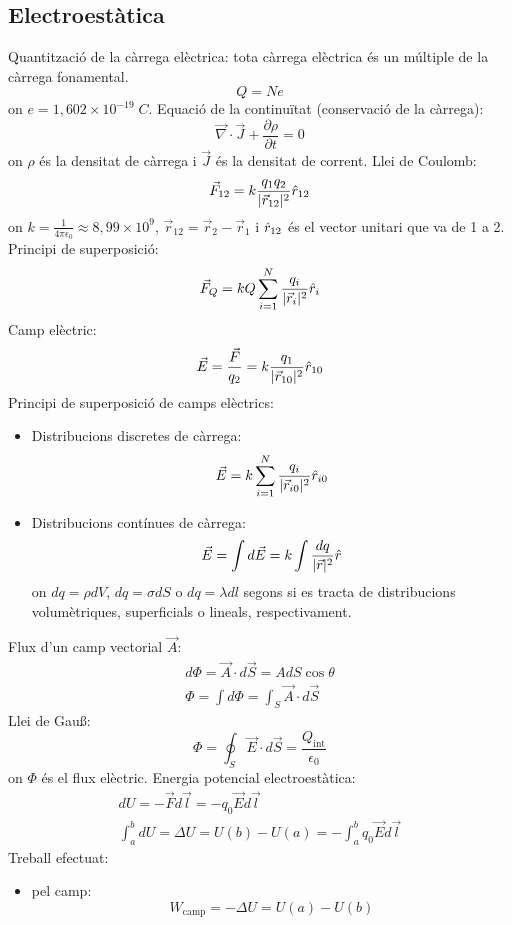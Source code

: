 \documentclass[class=article,10pt,crop=false]{standalone}
\begin{document}
\begin{multicols}{2}
\subsection{Electroestàtica}
Quantització de la càrrega elèctrica: tota càrrega elèctrica és un múltiple de la càrrega fonamental.
$$Q=Ne$$
{on $e=1,602\times10^{-19}\;C$.}\newline
Equació de la continuïtat (conservació de la càrrega): $$\Vec{\nabla}\cdot\Vec{J}+\frac{\partial\rho}{\partial t}=0$$
{on $\rho$ és la densitat de càrrega i $\Vec{J}$ és la densitat de corrent.}\newline
Llei de Coulomb: $$\Vec{F}_{12}=k\frac{q_1q_2}{|\Vec{r}_{12}|^2}\Hat{r}_{12}$$
{on $k=\frac{1}{4\pi\epsilon_0}\approx8,99\times10^9$, $\Vec{r}_{12}=\Vec{r}_2-\Vec{r}_1$ i $\Hat{r}_{12}$ és el vector unitari que va de 1 a 2.}\newline
Principi de superposició: $$\Vec{F}_Q=kQ\sum_{i=1}^N\frac{q_i}{|\Vec{r}_i|^2}\Hat{r}_i$$
Camp elèctric: $$\Vec{E}=\frac{\Vec{F}}{q_2}=k\frac{q_1}{|\Vec{r}_{10}|^2}\Hat{r}_{10}$$
Principi de superposició de camps elèctrics:
\begin{itemize}
    \item Distribucions discretes de càrrega:
    $$\Vec{E}=k\sum_{i=1}^N\frac{q_i}{|\Vec{r}_{i0}|^2}\Hat{r}_{i0}$$
    \item Distribucions contínues de càrrega:
    $$\Vec{E}=\int d\Vec{E}=k\int\frac{dq}{|\Vec{r}|^2}\Hat{r}$$
    {on $dq=\rho dV$, $dq=\sigma dS$ o $dq=\lambda dl$ segons si es tracta de distribucions volumètriques, superficials o lineals, respectivament.}
\end{itemize}
Flux d'un camp vectorial $\Vec{A}$: 
\begin{gather*}
    d\Phi=\Vec{A}\cdot d\Vec{S}=AdS\cos\theta\\
    \Phi=\int d\Phi=\int_S\Vec{A}\cdot d\Vec{S}
\end{gather*}
Llei de Gau\ss:
$$\Phi=\oint_S\Vec{E}\cdot d\Vec{S}=\frac{Q_{\text{int}}}{\epsilon_0}$${on $\Phi$ és el flux elèctric.}\newline
Energia potencial electroestàtica:
\begin{gather*}
    dU=-\Vec{F}d\Vec{l}=-q_0\Vec{E}d\Vec{l}\\
    \int_a^bdU=\Delta U=U(b)-U(a)=-\int_a^bq_0\Vec{E}d\Vec{l}
\end{gather*}
Treball efectuat:
\begin{itemize}
    \item pel camp: $$W_{\text{camp}}=-\Delta U=U(a)-U(b)$$

\end{itemize}
\end{multicols}
\end{document}
